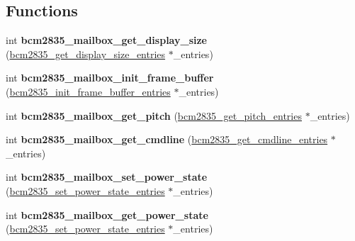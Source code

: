 \subsection*{Functions}
\begin{DoxyCompactItemize}
\item 
\mbox{\label{group__raspberrypi__vc_ga6734a225ab1f2ddcb1b7d6be8e425181}} 
int {\bfseries bcm2835\+\_\+mailbox\+\_\+get\+\_\+display\+\_\+size} (\mbox{\hyperlink{structbcm2835__get__display__size__entries}{bcm2835\+\_\+get\+\_\+display\+\_\+size\+\_\+entries}} $\ast$\+\_\+entries)
\item 
\mbox{\label{group__raspberrypi__vc_ga18d2d152af0e672f37ff4ca7f8715d23}} 
int {\bfseries bcm2835\+\_\+mailbox\+\_\+init\+\_\+frame\+\_\+buffer} (\mbox{\hyperlink{structbcm2835__init__frame__buffer__entries}{bcm2835\+\_\+init\+\_\+frame\+\_\+buffer\+\_\+entries}} $\ast$\+\_\+entries)
\item 
\mbox{\label{group__raspberrypi__vc_ga2a4df21818f5c38955f238b17cde5779}} 
int {\bfseries bcm2835\+\_\+mailbox\+\_\+get\+\_\+pitch} (\mbox{\hyperlink{structbcm2835__get__pitch__entries}{bcm2835\+\_\+get\+\_\+pitch\+\_\+entries}} $\ast$\+\_\+entries)
\item 
\mbox{\label{group__raspberrypi__vc_ga3f212cbf69fd3bcbe941eaf3137c62dc}} 
int {\bfseries bcm2835\+\_\+mailbox\+\_\+get\+\_\+cmdline} (\mbox{\hyperlink{structbcm2835__get__cmdline__entries}{bcm2835\+\_\+get\+\_\+cmdline\+\_\+entries}} $\ast$\+\_\+entries)
\item 
\mbox{\label{group__raspberrypi__vc_ga5622a063aaac90980a872f376f6d42b5}} 
int {\bfseries bcm2835\+\_\+mailbox\+\_\+set\+\_\+power\+\_\+state} (\mbox{\hyperlink{structbcm2835__set__power__state__entries}{bcm2835\+\_\+set\+\_\+power\+\_\+state\+\_\+entries}} $\ast$\+\_\+entries)
\item 
\mbox{\label{group__raspberrypi__vc_gacae007f8d5e749873dccb31fbe8dc0e7}} 
int {\bfseries bcm2835\+\_\+mailbox\+\_\+get\+\_\+power\+\_\+state} (\mbox{\hyperlink{structbcm2835__set__power__state__entries}{bcm2835\+\_\+set\+\_\+power\+\_\+state\+\_\+entries}} $\ast$\+\_\+entries)
\item 

\end{DoxyCompactItemize}
